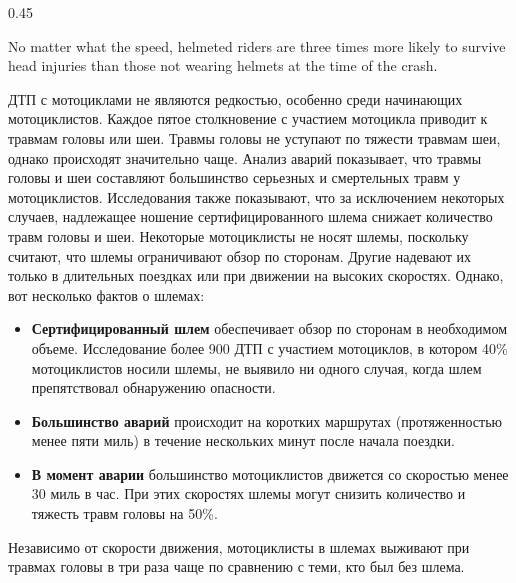 \begin{langblock}{0.45}
\begin{eng}
	No matter what the speed, helmeted riders are three times more likely to survive head injuries than those not wearing helmets at the time of the crash.
	\end{eng}
	\begin{rus}
		ДТП с мотоциклами не являются редкостью, особенно среди начинающих мотоциклистов. Каждое пятое столкновение с участием мотоцикла приводит к травмам головы или шеи. Травмы головы не уступают по тяжести травмам шеи, однако происходят значительно чаще. Анализ аварий показывает, что травмы головы и шеи составляют большинство серьезных и смертельных травм у мотоциклистов. Исследования также показывают, что за исключением некоторых случаев, надлежащее ношение сертифицированного шлема снижает количество травм головы и шеи. 
		Некоторые мотоциклисты не носят шлемы, поскольку считают, что шлемы ограничивают обзор по сторонам. Другие надевают их только в длительных поездках или при движении на высоких скоростях. Однако, вот несколько фактов о шлемах:
		\begin{itemize}
			\item \textbf{Сертифицированный шлем} обеспечивает обзор по сторонам в необходимом объеме. Исследование более 900 ДТП с участием мотоциклов, в котором 40\% мотоциклистов носили шлемы, не выявило ни одного случая, когда шлем препятствовал обнаружению опасности.
			\item \textbf{Большинство аварий} происходит на коротких маршрутах (протяженностью менее пяти миль) в течение нескольких минут после начала поездки.
			\item \textbf{В момент аварии} большинство мотоциклистов движется со скоростью менее 30 миль в час. При этих скоростях шлемы могут снизить количество и тяжесть травм головы на 50\%.
		\end{itemize}
		Независимо от скорости движения, мотоциклисты в шлемах выживают при травмах головы в три раза чаще по сравнению с теми, кто был без шлема.
	\end{rus}
\end{langblock}



